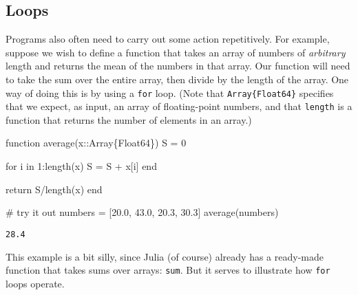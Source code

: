 \documentclass[
  letterpaper,
  DIV=11,
  numbers=noendperiod]{scrartcl}
\newenvironment{Shaded}{\begin{snugshade}}{\end{snugshade}}
\newcommand{\CommentTok}[1]{\textcolor[rgb]{0.37,0.37,0.37}{#1}}
\newcommand{\ControlFlowTok}[1]{\textcolor[rgb]{0.00,0.23,0.31}{#1}}
\newcommand{\DataTypeTok}[1]{\textcolor[rgb]{0.68,0.00,0.00}{#1}}
\newcommand{\FloatTok}[1]{\textcolor[rgb]{0.68,0.00,0.00}{#1}}
\newcommand{\FunctionTok}[1]{\textcolor[rgb]{0.28,0.35,0.67}{#1}}
\newcommand{\KeywordTok}[1]{\textcolor[rgb]{0.00,0.23,0.31}{#1}}
\newcommand{\NormalTok}[1]{\textcolor[rgb]{0.00,0.23,0.31}{#1}}
\newcommand{\OperatorTok}[1]{\textcolor[rgb]{0.37,0.37,0.37}{#1}}
\begin{document}
\subsection{Loops}\label{loops}

Programs also often need to carry out some action repetitively. For
example, suppose we wish to define a function that takes an array of
numbers of \emph{arbitrary} length and returns the mean of the numbers
in that array. Our function will need to take the sum over the entire
array, then divide by the length of the array. One way of doing this is
by using a \texttt{for} loop. (Note that \texttt{Array\{Float64\}}
specifies that we expect, as input, an array of floating-point numbers,
and that \texttt{length} is a function that returns the number of
elements in an array.)

\begin{Shaded}
\begin{Highlighting}[]
\KeywordTok{function} \FunctionTok{average}\NormalTok{(x}\OperatorTok{::}\DataTypeTok{Array\{Float64\}}\NormalTok{)}
\NormalTok{  S }\OperatorTok{=} \FloatTok{0}

  \ControlFlowTok{for}\NormalTok{ i }\KeywordTok{in} \FloatTok{1}\OperatorTok{:}\FunctionTok{length}\NormalTok{(x)}
\NormalTok{    S }\OperatorTok{=}\NormalTok{ S }\OperatorTok{+}\NormalTok{ x[i]}
  \ControlFlowTok{end}

  \ControlFlowTok{return}\NormalTok{ S}\OperatorTok{/}\FunctionTok{length}\NormalTok{(x)}
\KeywordTok{end}

\CommentTok{\# try it out}
\NormalTok{numbers }\OperatorTok{=}\NormalTok{ [}\FloatTok{20.0}\NormalTok{, }\FloatTok{43.0}\NormalTok{, }\FloatTok{20.3}\NormalTok{, }\FloatTok{30.3}\NormalTok{]}
\FunctionTok{average}\NormalTok{(numbers)}
\end{Highlighting}
\end{Shaded}

\begin{verbatim}
28.4
\end{verbatim}

\begin{tcolorbox}[enhanced jigsaw, left=2mm, colbacktitle=quarto-callout-note-color!10!white, titlerule=0mm, breakable, arc=.35mm, opacitybacktitle=0.6, coltitle=black, opacityback=0, toprule=.15mm, bottomrule=.15mm, colframe=quarto-callout-note-color-frame, bottomtitle=1mm, rightrule=.15mm, leftrule=.75mm, colback=white, toptitle=1mm, title=\textcolor{quarto-callout-note-color}{\faInfo}\hspace{0.5em}{Note}]

This example is a bit silly, since Julia (of course) already has a
ready-made function that takes sums over arrays: \texttt{sum}. But it
serves to illustrate how \texttt{for} loops operate.

\end{tcolorbox}
\end{document}
